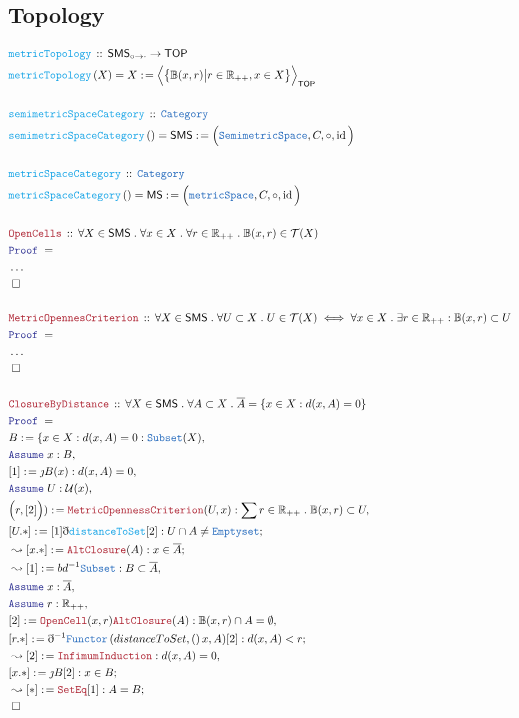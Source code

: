 \documentclass[12pt]{scrartcl}
\newcommand{\TYPE}[1]{\textcolor{NavyBlue}{\mathtt{#1}}}
\newcommand{\FUNC}[1]{\textcolor{Cerulean}{\mathtt{#1}}}
\newcommand{\LOGIC}[1]{\textcolor{Blue}{\mathtt{#1}}}
\newcommand{\THM}[1]{\textcolor{Maroon}{\mathtt{#1}}}
\renewcommand{\.}{\; . \;}
\newcommand{\de}{: \kern 0.1pc =}
\newcommand{\Act}[1]{\left( #1 \right)}
\newcommand{\Theorem}[2]{& \THM{#1} \, :: \, #2 \\ & \Proof = \\ }
\newcommand{\DeclareFunc}[2]{& \FUNC{#1} \, :: \, #2 \\}
\newcommand{\DefineNamedFunc}[4]{&  \FUNC{#1}\Act{#2} = #3 \de #4 \\}
\newcommand{\Page}[1]{ \begin{align*} #1 \end{align*}   }
\newcommand{ \bd }{ \ByDef }
\newcommand{\NoProof}{ & \ldots \\ \EndProof}
\newcommand{\Reals}{\mathbb{R} }
\DeclareMathOperator*{\id}{id}
\newcommand{\Cat}{\TYPE{Category}}
\newcommand{\Func}[2]{\TYPE{Functor}\left( #1, #2 \right)}
\newcommand{\Say}[3]{& #1 \de #2 : #3, \\}
\newcommand{\Conclude}[3]{& #1 \de #2 : #3; \\}
\newcommand{\Derive}[3]{& \leadsto #1 \de #2 : #3, \\}
\newcommand{\DeriveConclude}[3]{& \leadsto #1 \de #2 : #3 ; \\}
\newcommand{\Assume}[2]{& \LOGIC{Assume} \; #1 : #2, \\}
\newcommand{\QED}{\; \square}
\newcommand{\EndProof}{& \QED \\}
\newcommand{\ByDef}{\eth}
\newcommand{\ByConstr}{\jmath}
\newcommand{\Proof}{\LOGIC{Proof} \; }
\newcommand{\TOP}{\mathsf{TOP}}
\newcommand{\T}{\mathcal{T}}
\renewcommand{\U}{\mathcal{U}}
\newcommand{\Semiiso}{\mathsf{SMS}_{\circ \to \cdot}}
\newcommand{\SMS}{\mathsf{SMS}}
\begin{document}
\subsection{Topology}
\Page{       
	\DeclareFunc{metricTopology}  
	{
		\Semiiso \to \TOP
	}
	\DefineNamedFunc{metricTopology}{X}{X}{\Big\langle \big\{  \mathbb{B}(x,r)  \big|  r \in \Reals_{++}, x \in X  \big\}   \Big\rangle_{\TOP}}
	\\
	\DeclareFunc{semimetricSpaceCategory}{\Cat}
	\DefineNamedFunc{semimetricSpaceCategory}{}{\mathsf{SMS}}{ \Big(  \TYPE{SemimetricSpace}, C, \circ, \id \Big)  }
	\\
	\DeclareFunc{metricSpaceCategory}{\Cat}
	\DefineNamedFunc{metricSpaceCategory}{}{\mathsf{MS}}{ \Big(  \TYPE{metricSpace}, C, \circ, \id \Big)  }
	\\
	\Theorem{OpenCells}{\forall X \in \SMS \. \forall x \in X \. \forall r \in \Reals_{++} \. \mathbb{B}(x,r) \in \T(X) }
	\NoProof
	\\
	\Theorem{MetricOpennesCriterion}{\forall X \in \SMS \. \forall U \subset X \. U \in \T(X) \iff \forall x \in X \. \exists r \in \Reals_{++} : \mathbb{B}(x,r) \subset U }
	\NoProof
	\\
	\Theorem{ClosureByDistance}{\forall X \in \SMS \. \forall A \subset X \. \overline{A} = \{  x \in X : d(x,A) = 0 \}}
	\Say{B}{ \{ x \in X : d(x,A) = 0}{\TYPE{Subset}(X)}
	\Assume{x}{B}
	\Say{[1]}{\ByConstr B (x)}{d(x,A) = 0}
	\Assume{U}{\U(x)}
	\Say{\Big(r,[2] \Big))}{\THM{MetricOpennessCriterion}(U,x)}{\sum r \in \Reals_{++} \. \mathbb{B}(x,r) \subset U}
	\Conclude{[U.*]}{[1]\bd \FUNC{distanceToSet}[2]}{U \cap A \neq \TYPE{Emptyset}}
	\DeriveConclude{[x.*]}{\THM{AltClosure}(A)}{ x \in \overline{A}}
	\Derive{[1]}{bd^{-1} \TYPE{Subset} }{B \subset \overline{A}}
	\Assume{x}{\overline{A}}
	\Assume{r}{\Reals_{++}}
	\Say{[2]}{\THM{OpenCell}(x,r)\THM{AltClosure}(A)}{\mathbb{B}(x,r) \cap A = \emptyset }
	\Conclude{[r.*]}{\bd^{-1} \Func{distanceToSet}(x,A)[2]}{ d(x,A) < r}
	\Derive{[2]}{\THM{InfimumInduction}}{ d(x,A) = 0}
	\Conclude{[x.*]}{\ByConstr B [2]}{x \in B}
	\DeriveConclude{[*]}{\THM{SetEq}[1]}{A = B}
	\EndProof
}
\end{document}
